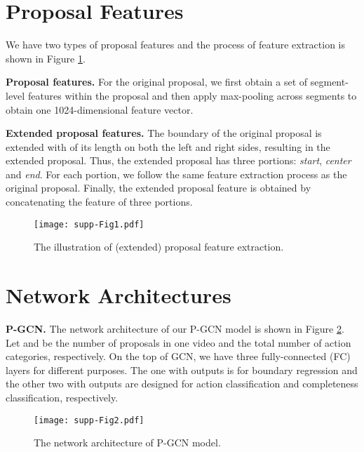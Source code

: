 \documentclass[10pt,twocolumn,letterpaper]{article}
\begin{document}
\newpage
\normalsize
\setcounter{section}{0}
\renewcommand\thesection{\Alph{section}}
\setcounter{figure}{0}
\renewcommand\thefigure{\Alph{figure}}
\setcounter{table}{0}
\renewcommand\thetable{\Alph{table}}
\section{Proposal Features}

We have two types of proposal features and the process of feature extraction is shown in Figure \ref{Fig:feature}.

\noindent \textbf{Proposal features.} For the original proposal, we first obtain a set of segment-level features within the proposal and then apply max-pooling across segments to obtain one 1024-dimensional feature vector.

\noindent \textbf{Extended proposal features.} The boundary of the original proposal is extended with  of its length on both the left and right sides, resulting in the extended proposal. Thus, the extended proposal has three portions: \emph{start}, \emph{center} and \emph{end}. For each portion, we follow the same feature extraction process as the original proposal. Finally, the extended proposal feature is obtained by concatenating the feature of three portions.

\begin{figure}[!h]
	\centering
	\texttt{[image: supp-Fig1.pdf]}
	\caption{The illustration of (extended) proposal feature extraction.}
	\label{Fig:feature}
\end{figure}


\section{Network Architectures}

\noindent \textbf{P-GCN.}
The network architecture of our P-GCN model is shown in Figure \ref{Fig:network}. Let  and  be the number of proposals in one video and the total number of action categories, respectively.
On the top of GCN, we have three fully-connected (FC) layers for different purposes. The one with  outputs is for boundary regression and the other two with  outputs are designed for action classification and completeness classification, respectively.

\begin{figure}[!tb]
	\centering
	\texttt{[image: supp-Fig2.pdf]}
	\caption{The network architecture of P-GCN model.}
	\label{Fig:network}
\end{figure}
\end{document}
